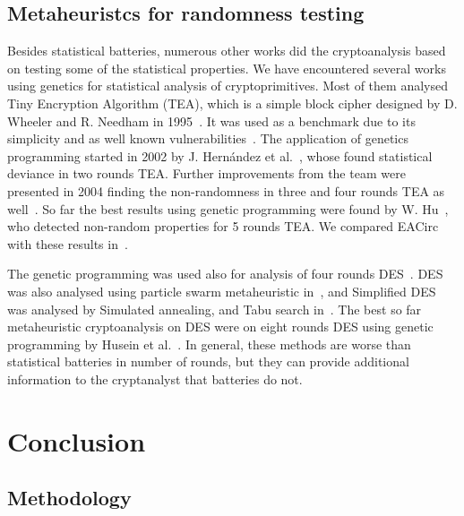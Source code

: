 \documentclass[
  print, %
  Table,   %
  nolof,     %
  nolot,     %
  11pt, %
  oneside  %
]{fithesis3}
\begin{document}

\section{Metaheuristcs for randomness testing}
\label{sec:relatwork-paper}

Besides statistical batteries, numerous other works did the cryptoanalysis based on testing some of the statistical properties. We have encountered several works using genetics for statistical analysis of cryptoprimitives. Most of them analysed Tiny Encryption Algorithm (TEA), which is a simple block cipher designed by D. Wheeler and R. Needham in 1995~\cite{TEA}. It was used as a benchmark due to its simplicity and as well known vulnerabilities~\cite{TEAAttack}. The application of genetics programming started in 2002 by J. Hernández et al.~\cite{twoRoundsTea}, whose found statistical deviance in two rounds TEA. Further improvements from the team were presented in 2004 finding the non-randomness in three and four rounds TEA as well~\cite{fourRoundsTea}. So far the best results using genetic programming were found by W. Hu~\cite{fiveRoundsTea}, who detected non-random properties for 5 rounds TEA. We compared EACirc with these results in~\cite{2016-infocommunications-kubicek}.

The genetic programming was used also for analysis of four rounds DES~\cite{song2007cryptanalysis}. DES was also analysed using particle swarm metaheuristic in~\cite{shahzad2009cryptanalysis}, and Simplified DES was analysed by Simulated annealing, and Tabu search in~\cite{nalini2005cryptanalysis}. The best so far metaheuristic cryptoanalysis on DES were on eight rounds DES using genetic programming by Husein et al.~\cite{husein2007genetic}. In general, these methods are worse than statistical batteries in number of rounds, but they can provide additional information to the cryptanalyst that batteries do not.


\chapter{Conclusion}
\label{chap:conclusion}

\section{Methodology}
\label{sec:conclusion-method}
\end{document}
